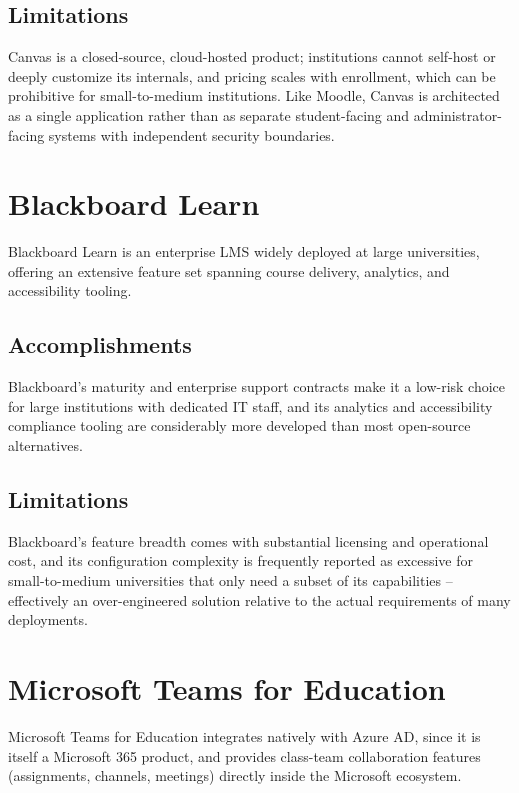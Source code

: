 \documentclass[12pt,a4paper]{report}
\begin{document}
\subsection{Limitations}

Canvas is a closed-source, cloud-hosted product; institutions cannot
self-host or deeply customize its internals, and pricing scales with
enrollment, which can be prohibitive for small-to-medium institutions.
Like Moodle, Canvas is architected as a single application rather than
as separate student-facing and administrator-facing systems with
independent security boundaries.

\section{Blackboard Learn}

Blackboard Learn is an enterprise LMS widely deployed at large
universities, offering an extensive feature set spanning course
delivery, analytics, and accessibility tooling.

\subsection{Accomplishments}

Blackboard's maturity and enterprise support contracts make it a
low-risk choice for large institutions with dedicated IT staff, and its
analytics and accessibility compliance tooling are considerably more
developed than most open-source alternatives.

\subsection{Limitations}

Blackboard's feature breadth comes with substantial licensing and
operational cost, and its configuration complexity is frequently
reported as excessive for small-to-medium universities that only need a
subset of its capabilities -- effectively an over-engineered solution
relative to the actual requirements of many deployments.

\section{Microsoft Teams for Education}

Microsoft Teams for Education integrates natively with Azure AD, since
it is itself a Microsoft 365 product, and provides class-team
collaboration features (assignments, channels, meetings) directly
inside the Microsoft ecosystem.
\end{document}
